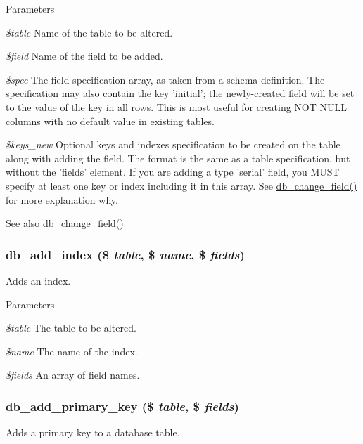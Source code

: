 \begin{DoxyParams}{Parameters}
\item[{\em \$table}]Name of the table to be altered. \item[{\em \$field}]Name of the field to be added. \item[{\em \$spec}]The field specification array, as taken from a schema definition. The specification may also contain the key 'initial'; the newly-\/created field will be set to the value of the key in all rows. This is most useful for creating NOT NULL columns with no default value in existing tables. \item[{\em \$keys\_\-new}]Optional keys and indexes specification to be created on the table along with adding the field. The format is the same as a table specification, but without the 'fields' element. If you are adding a type 'serial' field, you MUST specify at least one key or index including it in this array. See \hyperlink{group__schemaapi_ga9e0a4211eb8137e187d5f3f4fa716cea}{db\_\-change\_\-field()} for more explanation why.\end{DoxyParams}
\begin{DoxySeeAlso}{See also}
\hyperlink{group__schemaapi_ga9e0a4211eb8137e187d5f3f4fa716cea}{db\_\-change\_\-field()} 
\end{DoxySeeAlso}
\hypertarget{group__schemaapi_gafb7153a65df9b5a0877a602cde86a0cc}{
\subsubsection[{db\_\-add\_\-index}]{\setlength{\rightskip}{0pt plus 5cm}db\_\-add\_\-index (\$ {\em table}, \/  \$ {\em name}, \/  \$ {\em fields})}}
\label{group__schemaapi_gafb7153a65df9b5a0877a602cde86a0cc}
Adds an index.


\begin{DoxyParams}{Parameters}
\item[{\em \$table}]The table to be altered. \item[{\em \$name}]The name of the index. \item[{\em \$fields}]An array of field names. \end{DoxyParams}
\hypertarget{group__schemaapi_ga666b117ebedc9b50dacf193c6ba4dcf8}{
\subsubsection[{db\_\-add\_\-primary\_\-key}]{\setlength{\rightskip}{0pt plus 5cm}db\_\-add\_\-primary\_\-key (\$ {\em table}, \/  \$ {\em fields})}}
\label{group__schemaapi_ga666b117ebedc9b50dacf193c6ba4dcf8}
Adds a primary key to a database table.


